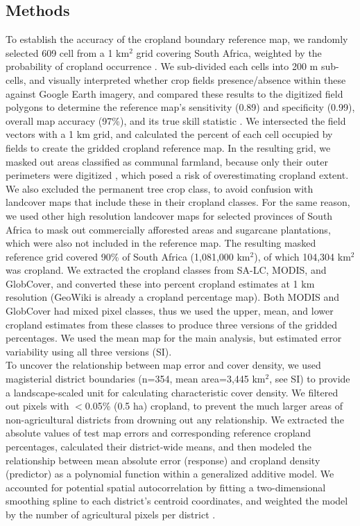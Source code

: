 \documentclass{pnastwo}
\begin{document}
\begin{article}


\begin{materials}
\section{Methods} 
To establish the accuracy of the cropland boundary reference map, we randomly selected 609 cell from a 1 km$^2$ grid covering South Africa, weighted by the probability of cropland occurrence \cite{estes_diylandcover:_2015}. We sub-divided each cells into 200 m sub-cells, and visually interpreted whether crop fields presence/absence within these against Google Earth imagery, and compared these results to the digitized field polygons to determine the reference map's sensitivity (0.89) and specificity (0.99), overall map accuracy (97\%), and its true skill statistic \cite[0.88;][]{allouche_assessing_2006}. We intersected the field vectors with a 1 km grid, and calculated the percent of each cell occupied by fields to create the gridded cropland reference map. In the resulting grid, we masked out areas classified as communal farmland, because only their outer perimeters were digitized \cite{fourie_better_2009}, which posed a risk of overestimating cropland extent. We also excluded the permanent tree crop class, to avoid confusion with landcover maps that include these in their cropland classes. For the same reason, we used other high resolution landcover maps for selected provinces of South Africa to mask out commercially afforested areas and sugarcane plantations, which were also not included in the reference map. The resulting masked reference grid covered 90\% of South Africa (1,081,000 km$^2$), of which 104,304 km$^2$ was cropland.
We extracted the cropland classes from SA-LC, MODIS, and GlobCover, and converted these into percent cropland estimates at 1 km resolution (GeoWiki is already a cropland percentage map). Both MODIS and GlobCover had mixed pixel classes, thus we used the upper, mean, and lower cropland estimates from these classes to produce three versions of the gridded percentages. We used the mean map for the main analysis, but estimated error variability using all three versions (SI).\\  
\indent To uncover the relationship between map error and cover density, we used magisterial district boundaries (n=354, mean area=3,445 km$^2$, see SI) to provide a landscape-scaled unit for calculating characteristic cover density. We filtered out pixels with $<$0.05\% (0.5 ha) cropland, to prevent the much larger areas of non-agricultural districts from drowning out any relationship. We extracted the absolute values of test map errors and corresponding reference cropland percentages, calculated their district-wide means, and then modeled the relationship between mean absolute error (response) and cropland density (predictor) as a polynomial function within a generalized additive model. We accounted for potential spatial autocorrelation by fitting a two-dimensional smoothing spline to each district's centroid coordinates, and weighted the model by the number of agricultural pixels per district \cite{wood_mgcv:_2001}.\\   

\end{materials}
\end{article}
\end{document}
